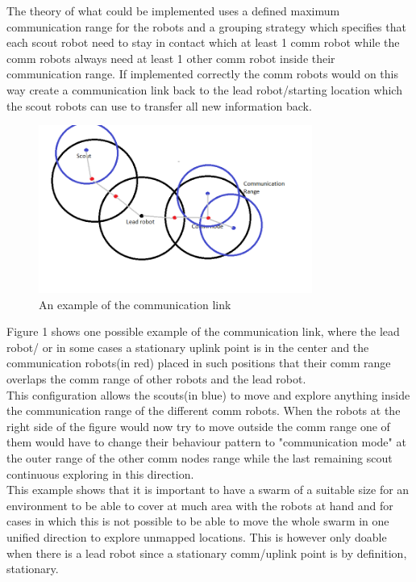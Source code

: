 The theory of what could be  implemented uses a defined maximum communication range for the robots and a grouping strategy which specifies that each scout robot need to stay in contact which at least 1 comm robot while the comm robots always need at least 1 other comm robot inside their communication range. If implemented correctly the comm robots would on this way create a communication link back to the lead robot/starting location which the scout robots can use to transfer all new information back.\\

\begin{figure}[h]
\centering
\includegraphics[width = 0.8\textwidth]{../../figures/comm_example.png} 
\caption{An example of the communication link}
\label{Figure 1}
\end{figure}

Figure 1 shows one possible example of the communication link, where the lead robot/ or in some cases a stationary uplink point is in the center and the communication robots(in red) placed in such positions that their comm range overlaps the comm range of other robots and the lead robot. \\
This configuration allows the scouts(in blue) to move and explore anything inside the communication range of the different comm robots. When the robots at the right side of the figure would now try to move outside the comm range one of them would have to change their behaviour pattern to "communication mode" at the outer range of the other comm nodes range while the last remaining scout continuous exploring in this direction. \\
This example shows that it is important to have a swarm of a suitable size for an environment to be able to cover at much area with the robots at hand and for cases in which this is not possible to be able to move the whole swarm in one unified direction to explore unmapped locations. This is however only doable when there is a lead robot since a stationary comm/uplink point is by definition, stationary.\\